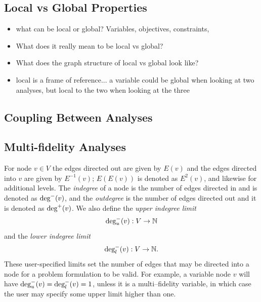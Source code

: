 \subsection{Local vs Global Properties}

\begin{itemize}
  \item what can be local or global? Variables, objectives, constraints, 
  \item What does it really mean to be local vs global? 
  \item What does the graph structure of local vs global look like? 
  \item local is a frame of reference... a variable could be global when looking at two analyses, but local to the two when looking at the three
\end{itemize}

\subsection{Coupling Between Analyses}

\subsection{Multi-fidelity Analyses}

For node $v \in V$ the edges directed out are given by $E(v)$ and the edges directed into $v$ are given by $E^{-1}(v)$; $E(E(v))$ is denoted as $E^2(v)$, and likewise for additional levels. 
The \emph{indegree} of a node is the number of edges directed in and is denoted as $\textrm{deg}^-(v)$, and the \emph{outdegree} is the number of edges directed out and it is denoted as $\textrm{deg}^+(v)$.
We also define the \emph{upper indegree limit} 
\begin{equation}
\textrm{deg}_u^-(v):V \to \mathbb{N}
\end{equation} 
and the \emph{lower indegree limit}
\begin{equation}
\textrm{deg}_l^-(v):V \to \mathbb{N}.
\end{equation}
These user-specified limits set the number of edges that may be directed into a node for a problem formulation to be valid. For example, a variable node $v$ will have $\textrm{deg}_u^-(v) = \textrm{deg}_l^-(v) = 1$, unless it is a multi--fidelity variable, in which case the user may specify some upper limit higher than one.

